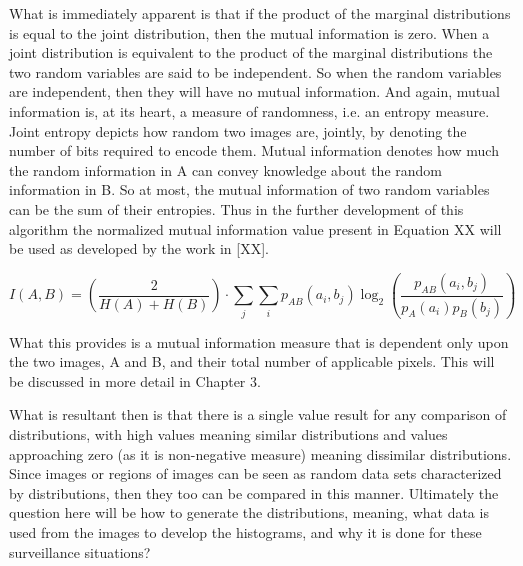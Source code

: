 What is immediately apparent is that if the product of the marginal distributions is equal to the joint distribution, then the mutual information is zero. When a joint distribution is equivalent to the product of the marginal distributions the two random variables are said to be independent. So when the random variables are independent, then they will have no mutual information. And again, mutual information is, at its heart, a measure of randomness, i.e. an entropy measure. Joint entropy depicts how random two images are, jointly, by denoting the number of bits required to encode them. Mutual information denotes how much the random information in A can convey knowledge about the random information in B. So at most, the mutual information of two random variables can be the sum of their entropies. Thus in the further development of this algorithm the normalized mutual information value present in Equation XX will be used as developed by the work in [XX].

\begin{equation}
\label{NormalizedMutualInformation}
	I(A,B) = \left( \frac{2}{H(A) + H(B)}\right) \cdot \sum_{j}{\sum_{i}{p_{AB}(a_{i},b_{j}) \log_{2}{\left( \frac{p_{AB}(a_{i},b_{j})}{p_{A}(a_{i})p_{B}(b_{j})}\right)}}}
\end{equation}

What this provides is a mutual information measure that is dependent only upon the two images, A and B, and their total number of applicable pixels. This will be discussed in more detail in Chapter 3.

What is resultant then is that there is a single value result for any comparison of distributions, with high values meaning similar distributions and values approaching zero (as it is non-negative measure) meaning dissimilar distributions. Since images or regions of images can be seen as random data sets characterized by distributions, then they too can be compared in this manner. Ultimately the question here will be how to generate the distributions, meaning, what data is used from the images to develop the histograms, and why it is done for these surveillance situations?




